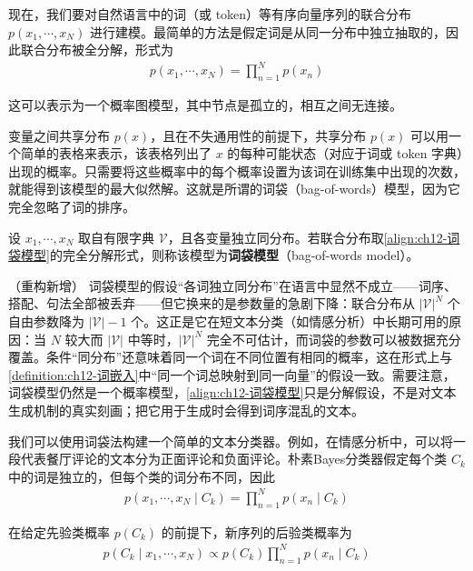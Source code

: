 \documentclass[../../main.tex]{subfiles}
\begin{document}
现在，我们要对自然语言中的词（或 token）等有序向量序列的联合分布 $p(x_1,\cdots,x_N)$ 进行建模。最简单的方法是假定词是从同一分布中独立抽取的，因此联合分布被全分解，形式为
\begin{align}
p(x_1,\cdots,x_N)=\prod_{n=1}^{N}p(x_n)
\label{align:ch12-词袋模型}
\end{align}

这可以表示为一个概率图模型，其中节点是孤立的，相互之间无连接。

变量之间共享分布 $p(x)$，且在不失通用性的前提下，共享分布 $p(x)$ 可以用一个简单的表格来表示，该表格列出了 $x$ 的每种可能状态（对应于词或 token 字典）出现的概率。只需要将这些概率中的每个概率设置为该词在训练集中出现的次数，就能得到该模型的最大似然解。这就是所谓的词袋（bag-of-words）模型，因为它完全忽略了词的排序。

\begin{definition}[词袋模型]\label{definition:ch12-词袋模型}
设 $x_1,\cdots,x_N$ 取自有限字典 $\mathcal{V}$，且各变量独立同分布。若联合分布取\eqref{align:ch12-词袋模型}的完全分解形式，则称该模型为\textbf{词袋模型}（bag-of-words model）。
\end{definition}

\begin{remark}（重构新增）
词袋模型的假设“各词独立同分布”在语言中显然不成立——词序、搭配、句法全部被丢弃——但它换来的是参数量的急剧下降：联合分布从 $|\mathcal{V}|^{N}$ 个自由参数降为 $|\mathcal{V}|-1$ 个。这正是它在短文本分类（如情感分析）中长期可用的原因：当 $N$ 较大而 $|\mathcal{V}|$ 中等时，$|\mathcal{V}|^{N}$ 完全不可估计，而词袋的参数可以被数据充分覆盖。条件“同分布”还意味着同一个词在不同位置有相同的概率，这在形式上与\cref{definition:ch12-词嵌入}中“同一个词总映射到同一向量”的假设一致。需要注意，词袋模型仍然是一个概率模型，\eqref{align:ch12-词袋模型}只是分解假设，不是对文本生成机制的真实刻画；把它用于生成时会得到词序混乱的文本。
\end{remark}

我们可以使用词袋法构建一个简单的文本分类器。例如，在情感分析中，可以将一段代表餐厅评论的文本分为正面评论和负面评论。朴素Bayes分类器假定每个类 $C_k$ 中的词是独立的，但每个类的词分布不同，因此
\begin{align}
p(x_1,\cdots,x_N\mid C_k)=\prod_{n=1}^{N}p(x_n\mid C_k)
\label{align:ch12-词袋类条件}
\end{align}

在给定先验类概率 $p(C_k)$ 的前提下，新序列的后验类概率为
\begin{align}
p(C_k\mid x_1,\cdots,x_N)\propto p(C_k)\prod_{n=1}^{N}p(x_n\mid C_k)
\label{align:ch12-词袋后验}
\end{align}
\end{document}
